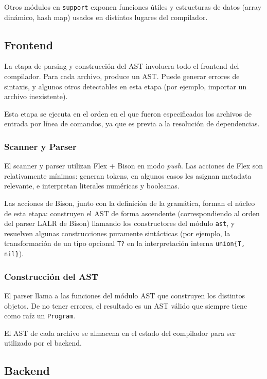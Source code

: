 Otros módulos en \texttt{support} exponen funciones útiles y estructuras de datos (array dinámico, hash map) usados en distintos lugares del compilador.

\subsection{Frontend}

La etapa de parsing y construcción del AST involucra todo el frontend del compilador. Para cada archivo, produce un AST. Puede generar errores de sintaxis, y algunos otros detectables en esta etapa (por ejemplo, importar un archivo inexistente).

Esta etapa se ejecuta en el orden en el que fueron especificados los archivos de entrada por línea de comandos, ya que es previa a la resolución de dependencias.

\subsubsection{Scanner y Parser}

El scanner y parser utilizan Flex + Bison en modo \textit{push}. Las acciones de Flex son relativamente mínimas: generan tokens, en algunos casos les asignan metadata relevante, e interpretan literales numéricas y booleanas.

Las acciones de Bison, junto con la definición de la gramática, forman el núcleo de esta etapa: construyen el AST de forma ascendente (correspondiendo al orden del parser LALR de Bison) llamando los constructores del módulo \texttt{ast}, y resuelven algunas construcciones puramente sintácticas (por ejemplo, la transformación de un tipo opcional \texttt{T?} en la interpretación interna \texttt{union\{T, nil\}}).

\subsubsection{Construcción del AST}

El parser llama a las funciones del módulo AST que construyen los distintos objetos. De no tener errores, el resultado es un AST válido que siempre tiene como raíz un \texttt{Program}.

El AST de cada archivo se almacena en el estado del compilador para ser utilizado por el backend.

\subsection{Backend}

